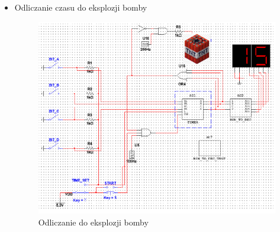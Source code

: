 \documentclass{article}
\begin{document}
\begin{itemize}
        \item Odliczanie czasu do eksplozji bomby \begin{figure}[H]
            \centering
            \captionsetup{font=small, skip=2pt}
            \includegraphics{images/bomba}
            \caption{Odliczanie do eksplozji bomby}
        \end{figure}
    \end{itemize}
    
    
\end{document}
